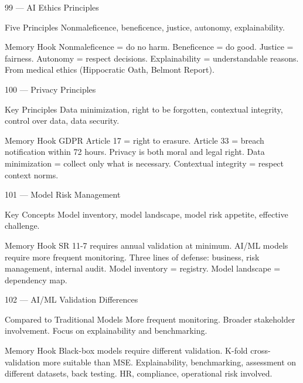 \documentclass[aspectratio=169,8pt]{beamer}
\begin{document}
	\begin{frame}{99 --- AI Ethics Principles}
		\begin{block}{Five Principles}
			Nonmaleficence, beneficence, justice, autonomy, explainability.
		\end{block}
		\begin{block}{Memory Hook}
			Nonmaleficence = do no harm. Beneficence = do good. Justice = fairness. Autonomy = respect decisions. Explainability = understandable reasons. From medical ethics (Hippocratic Oath, Belmont Report).
		\end{block}
	\end{frame}
	
	\begin{frame}{100 --- Privacy Principles}
		\begin{block}{Key Principles}
			Data minimization, right to be forgotten, contextual integrity, control over data, data security.
		\end{block}
		\begin{block}{Memory Hook}
			GDPR Article 17 = right to erasure. Article 33 = breach notification within 72 hours. Privacy is both moral and legal right. Data minimization = collect only what is necessary. Contextual integrity = respect context norms.
		\end{block}
	\end{frame}
	
	\begin{frame}{101 --- Model Risk Management}
		\begin{block}{Key Concepts}
			Model inventory, model landscape, model risk appetite, effective challenge.
		\end{block}
		\begin{block}{Memory Hook}
			SR 11-7 requires annual validation at minimum. AI/ML models require more frequent monitoring. Three lines of defense: business, risk management, internal audit. Model inventory = registry. Model landscape = dependency map.
		\end{block}
	\end{frame}
	
	\begin{frame}{102 --- AI/ML Validation Differences}
		\begin{block}{Compared to Traditional Models}
			More frequent monitoring. Broader stakeholder involvement. Focus on explainability and benchmarking.
		\end{block}
		\begin{block}{Memory Hook}
			Black-box models require different validation. K-fold cross-validation more suitable than MSE. Explainability, benchmarking, assessment on different datasets, back testing. HR, compliance, operational risk involved.
		\end{block}
	\end{frame}
	
\end{document}
